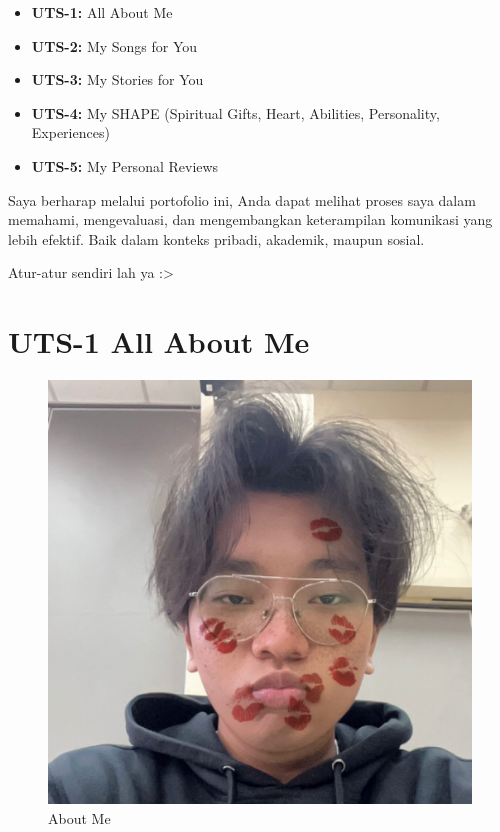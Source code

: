 \documentclass[
  letterpaper,
  DIV=11,
  numbers=noendperiod]{scrreprt}
\providecommand{\tightlist}{%
  \setlength{\itemsep}{0pt}\setlength{\parskip}{0pt}}
\begin{document}
\begin{itemize}
\tightlist
\item
  \textbf{UTS-1:} All About Me\\
\item
  \textbf{UTS-2:} My Songs for You\\
\item
  \textbf{UTS-3:} My Stories for You\\
\item
  \textbf{UTS-4:} My SHAPE (Spiritual Gifts, Heart, Abilities,
  Personality, Experiences)\\
\item
  \textbf{UTS-5:} My Personal Reviews
\end{itemize}

Saya berharap melalui portofolio ini, Anda dapat melihat proses saya
dalam memahami, mengevaluasi, dan mengembangkan keterampilan komunikasi
yang lebih efektif. Baik dalam konteks pribadi, akademik, maupun sosial.

Atur-atur sendiri lah ya :\textgreater{}


\chapter{UTS-1 All About Me}\label{uts-1-all-about-me}

\begin{figure}[H]

{\centering \includegraphics[width=9.5\linewidth,height=\textheight,keepaspectratio]{All_About_me/../images/ya.jpeg}

}

\caption{About Me}

\end{figure}%
\end{document}
